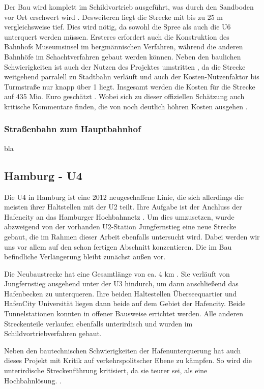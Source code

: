 Der Bau wird komplett im Schildvortrieb ausgeführt, was durch den Sandboden vor
Ort erschwert wird \cite{bkhU5}. Desweiteren liegt die Strecke
mit bis zu 25 m vergleichsweise tief. Dies wird nötig, da sowohl die Spree als
auch die U6 unterquert werden müssen. Ersteres erfordert auch die Konstruktion
des Bahnhofs Museumsinsel im bergmännischen Verfahren, während die anderen
Bahnhöfe im Schachtverfahren gebaut werden können. Neben den baulichen
Schwierigkeiten ist auch der Nutzen des Projektes umstritten \cite{ftdU5}, da
die Strecke weitgehend parralell zu Stadtbahn verläuft und auch der
Kosten-Nutzenfaktor bis Turmstraße nur knapp über 1 liegt. Insgesamt werden die
Kosten für die Strecke auf 435 Mio. Euro geschätzt \cite{bwwwU5}. Wobei
sich zu dieser offiziellen Schätzung auch kritische Kommentare finden, die von
noch deutlich höhren Kosten ausgehen \cite{ftdU5}.

\subsubsection*{Straßenbahn zum Hauptbahnhof}

bla

\subsection{Hamburg - U4}

Die U4 in Hamburg ist eine 2012 neugeschaffene Linie, die sich allerdings die
meisten ihrer Haltstellen mit der U2 teilt. Ihre Aufgabe ist der Anchluss der
Hafencity an das Hamburger Hochbahnnetz \cite{keuHH}. Um dies
umzusetzen, wurde abzweigend von der vorhanden U2-Station Jungfernstieg eine neue
Strecke gebaut, die im Rahmen dieser Arbeit ebenfalls untersucht wird. Dabei
werden wir uns vor allem auf den schon fertigen Abschnitt konzentieren. Die
im Bau befindliche Verlängerung bleibt zunächst außen vor.

Die Neubaustrecke hat eine Gesamtlänge von ca. 4 km \cite{keuHH}. Sie
verläuft von Jungfernstieg ausgehend unter der U3 hindurch, um dann anschließend
das Hafenbecken zu unterqueren. Ihre beiden Haltestellen Überseequartier und
HafenCity Universität liegen dann beide auf dem Gebiet der Hafencity. Beide
Tunnelstationen konnten in offener Bausweise errichtet werden. Alle anderen
Streckenteile verlaufen ebenfalls unterirdisch und wurden im
Schildvortriebverfahren gebaut.

Neben den bautechnischen Schwierigkeiten der Hafenunterquerung hat auch dieses
Projekt mit Kritik auf verkehrspolitscher Ebene zu kämpfen. So wird die
unterirdische Streckenführung kritisiert, da sie teurer sei, als eine
Hochbahnlösung. \cite{hamburgerAbendblattu4}.

